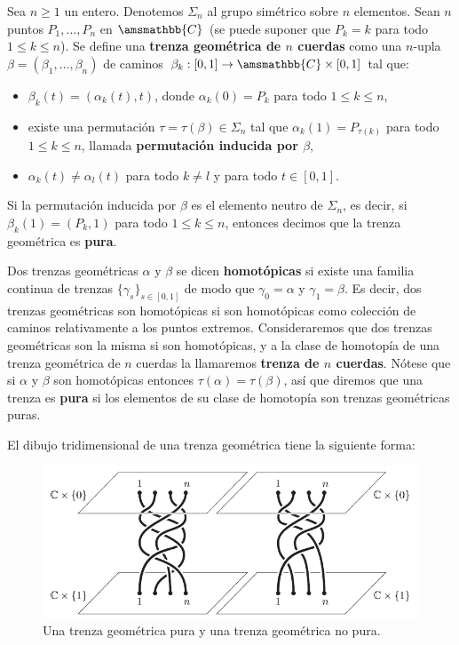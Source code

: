 \documentclass[bibtex, anon]{TEMat-article}
\newcommand{\CC}{\amsmathbb{C}}
\begin{document}
 \begin{defi}\label{geo}
 	Sea $n\geq 1$ un entero. Denotemos $\Sigma_n$ al grupo simétrico sobre $n$ elementos. Sean $n$ puntos $P_1,\dots, P_n$ en $\CC$ (se puede suponer que $P_k=k$ para todo $1\leq k\leq n$). Se define una \textbf{trenza geométrica de $n$ cuerdas} como una $n$-upla $\beta=(\beta_1,\dots,\beta_n)$ de caminos $\beta_k:[0,1]\to\CC\times[0,1]$ tal que:
 	\begin{itemize}
 		\item $\beta_k(t)=(\alpha_k(t),t)$, donde $\alpha_k(0)=P_k$ para todo $1\leq k\leq n$, 
 		\item existe una permutación $\tau=\tau(\beta)\in\Sigma_n$ tal que $\alpha_k(1)=P_{\tau(k)}$ para todo $1\leq k\leq n$, llamada \textbf{permutación inducida por $\beta$},
 		\item $\alpha_k(t)\neq \alpha_l(t)$ para todo $k\neq l$ y para todo $t\in[0,1]$.
 	\end{itemize}
 	Si la permutación inducida por $\beta$ es el elemento neutro de $\Sigma_n$, es decir, si $\beta_k(1)=(P_k,1)$ para todo $1\leq k\leq n$, entonces decimos que la trenza geométrica es \textbf{pura}.
 	
 	Dos trenzas geométricas $\alpha$ y $\beta$ se dicen \textbf{homotópicas} si existe una familia continua de trenzas $\{\gamma_s\}_{s\in[0,1]}$ de modo que $\gamma_0=\alpha$ y $\gamma_1=\beta$. Es decir, dos trenzas geométricas son homotópicas si son homotópicas como colección de caminos relativamente a los puntos extremos. Consideraremos que dos trenzas geométricas son la misma si son homotópicas, y a la clase de homotopía de una trenza geométrica de $n$ cuerdas la llamaremos \textbf{trenza de $n$ cuerdas}. Nótese que si $\alpha$ y $\beta$ son homotópicas entonces $\tau(\alpha)=\tau(\beta)$, así que diremos que una trenza es \textbf{pura} si los elementos de su clase de homotopía son trenzas geométricas puras.
 \end{defi}

El dibujo tridimensional de una trenza geométrica tiene la siguiente forma:
\begin{figure}[h!]
	\centering
	\includegraphics[scale=0.6]{Imagenes/hilos}
	\caption{Una trenza geométrica pura y una trenza geométrica no pura.}\label{hilos}
\end{figure}
\end{document}
